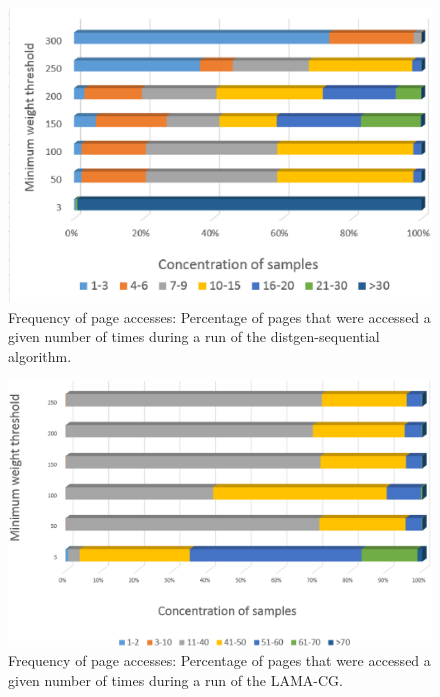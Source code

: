 \begin{figure}[th]
	\centering
		\includegraphics[width=.8\textwidth]{figures/pagetouch-dgenser.eps}
		\caption{Frequency of page accesses: Percentage of pages that were accessed a given number of times during a run of the distgen-sequential algorithm.}
		\label{fig:pmu-concentsamp-dgenser}
\end{figure}

\begin{figure}[th]
	\centering
		\includegraphics[width=.8\textwidth]{figures/pagetouch-dgenrdm.eps}
		\caption{Frequency of page accesses: Percentage of pages that were accessed a given number of times during a run of the LAMA-CG.}
		\label{fig:pmu-concentsamp-dgenlama}
\end{figure}


